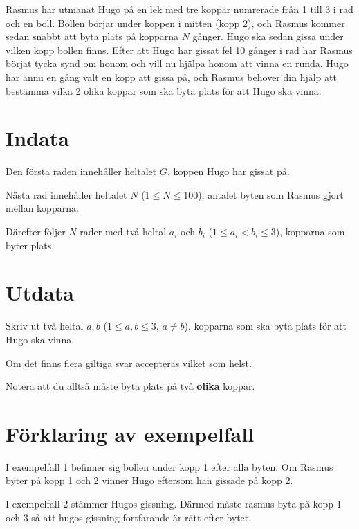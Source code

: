 
Rasmus har utmanat Hugo på en lek med tre koppar numrerade från 1 till 3 i rad och en boll. Bollen börjar under koppen i
mitten (kopp 2), och Rasmus kommer sedan snabbt att byta plats på kopparna $N$ gånger.
Hugo ska sedan gissa under vilken kopp bollen finns. Efter att Hugo har gissat fel 10 gånger i rad
har Rasmus börjat tycka synd om honom och vill nu hjälpa honom att vinna en runda.
Hugo har ännu en gång valt en kopp att gissa på, och Rasmus behöver din hjälp att bestämma vilka
2 olika koppar som ska byta plats för att Hugo ska vinna.

\section*{Indata}
Den första raden innehåller heltalet $G$, koppen Hugo har gissat på.

Nästa rad innehåller heltalet $N$ ($1 \le N \le 100$), antalet byten som Rasmus gjort mellan kopparna.

Därefter följer $N$ rader med två heltal $a_i$ och $b_i$ ($1 \le a_i < b_i \le 3$), kopparna som byter plats.

\section*{Utdata}
Skriv ut två heltal $a,b$ ($1 \leq a,b \leq 3$, $a \neq b$), kopparna som ska byta plats för att Hugo ska vinna.

Om det finns flera giltiga svar accepteras vilket som helst.

Notera att du alltså måste byta plats på två \textbf{olika} koppar.

\section*{Förklaring av exempelfall}
I exempelfall 1 befinner sig bollen under kopp 1 efter alla byten. Om Rasmus byter på kopp 1 och 2 vinner
Hugo eftersom han gissade på kopp 2.

I exempelfall 2 stämmer Hugos gissning. Därmed måste rasmus byta på kopp 1 och 3 så att hugos gissning
fortfarande är rätt efter bytet.

